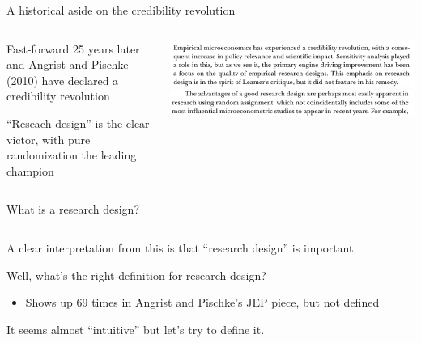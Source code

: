 \documentclass[notes,11pt, aspectratio=169]{beamer}
\newenvironment{wideitemize}{\itemize\addtolength{\itemsep}{10pt}}{\enditemize}
\begin{document}
\begin{frame}{A historical aside on the credibility revolution}
\begin{columns}[T] %
  \begin{column}{.4\textwidth}
    \begin{wideitemize}
    \item Fast-forward 25 years later and Angrist and Pischke (2010) have declared a credibility revolution
    \item ``Reseach design'' is the clear victor, with pure randomization the leading champion
    \end{wideitemize}
\end{column}%
\hfill%
\begin{column}{.6\textwidth}
  \includegraphics[width=0.9\linewidth]{images/angristpishke2010.png}\\
  \includegraphics[width=0.9\linewidth]{images/angristpishke2010b.png}\\
\end{column}%
\end{columns}
\end{frame}

\begin{frame}{What is a research design?}
\begin{columns}[T] %
  \begin{column}{.7\textwidth}
    \begin{wideitemize}
    \item A clear interpretation from this is that ``research design''
      is important.
    \item Well, what's the right definition for research design?
      \begin{itemize}
      \item Shows up 69 times in Angrist and Pischke's JEP piece, but not defined 
      \end{itemize}
    \item It seems almost ``intuitive'' but let's try to define it.
    \end{wideitemize}
\end{column}%
\hfill%
\begin{column}{.6\textwidth}
\end{column}%
\end{columns}
\end{frame}
\end{document}
